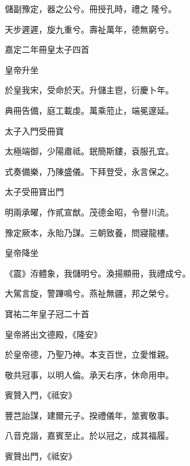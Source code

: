 \begin{pinyinscope}
 儲副豫定，器之公兮。冊授孔時，禮之
 隆兮。



 天步遲遲，旋九重兮。壽祉萬年，德無窮兮。



 嘉定二年冊皇太子四首



 皇帝升坐



 於皇我宋，受命於天。升儲主鬯，衍慶卜年。



 典冊告備，庭工載虔。萬乘蒞止，端冕邃延。



 太子入門受冊寶



 太極端御，少陽肅祗。鈱簡斯鏤，袞服孔宜。



 式奏備樂，乃陳盛儀。下拜登受，永言保之。



 太子受冊寶出門



 明兩承曜，作貳宣猷。茂德金昭，令譽川流。



 豫定厥本，永貽乃謀。三朝致養，問寢龍樓。



 皇帝降坐



 《震》洊體象，我儲明兮。渙揚顯冊，我禮成兮。



 大駕言旋，警蹕鳴兮。燕祉無疆，邦之榮兮。



 寶祐二年皇子冠二十首



 皇帝將出文德殿，《隆安》



 於皇帝德，乃聖乃神。本支百世，立愛惟親。



 敬共冠事，以明人倫。承天右序，休命用申。



 賓贊入門，《祗安》



 豐芑詒謀，建爾元子。揆禮儀年，筮賓敬事。



 八音克諧，嘉賓至止。於以冠之，成其福履。



 賓贊出門，《祗安》




\end{pinyinscope}
